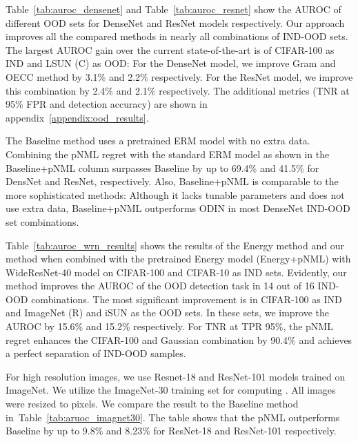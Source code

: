 \documentclass{article}
\def\appref#1{appendix~\ref{#1}}
\def\Tableref#1{Table~\ref{#1}}
\begin{document}
\Tableref{tab:auroc_densenet} and \Tableref{tab:auroc_resnet} show the AUROC of different OOD sets for DenseNet and ResNet models respectively.
Our approach improves all the compared methods in nearly all combinations of IND-OOD sets. 
The largest AUROC gain over the current state-of-the-art is of CIFAR-100 as IND and LSUN (C) as OOD: For the DenseNet model, we improve Gram and OECC method by 3.1\% and 2.2\% respectively. For the ResNet model, we improve this combination by 2.4\% and 2.1\% respectively. 
The additional metrics (TNR at 95\% FPR and detection accuracy) are shown in \appref{appendix:ood_results}.

The Baseline method uses a pretrained ERM model with no extra data. 
Combining the pNML regret with the standard ERM model as shown in the Baseline+pNML column surpasses Baseline by up to 69.4\% and 41.5\% for DensNet and ResNet, respectively.
Also, Baseline+pNML is comparable to the more sophisticated methods:
Although it lacks tunable parameters and does not use extra data, Baseline+pNML outperforms ODIN in most
DenseNet IND-OOD set combinations.

\Tableref{tab:auroc_wrn_results} shows the results of the Energy method and our method when combined with the pretrained Energy model (Energy+pNML) with WideResNet-40 model on CIFAR-100 and CIFAR-10 as IND sets.
Evidently, our method improves the AUROC of the OOD detection task in 14 out of 16 IND-OOD combinations.
The most significant improvement is in CIFAR-100 as IND and ImageNet (R) and iSUN as the OOD sets. In these sets, we improve the AUROC by 15.6\% and 15.2\% respectively. 
For TNR at TPR 95\%, the pNML regret enhances the CIFAR-100 and Gaussian combination by 90.4\% and achieves a perfect separation of IND-OOD samples. 


For high resolution images, we use Resnet-18 and ResNet-101 models trained on ImageNet. We utilize the ImageNet-30 training set for computing . All images were resized to  pixels. We compare the result to the Baseline method in~\Tableref{tab:aruoc_imagnet30}.
The table shows that the pNML outperforms Baseline by up to 9.8\% and 8.23\% for ResNet-18 and ResNet-101 respectively. 
\end{document}
